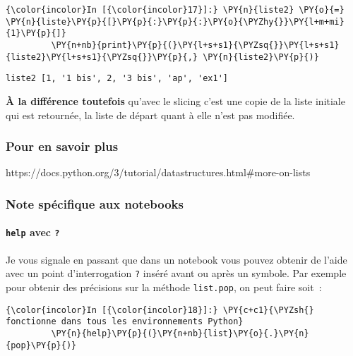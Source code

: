     \begin{Verbatim}[commandchars=\\\{\}]
{\color{incolor}In [{\color{incolor}17}]:} \PY{n}{liste2} \PY{o}{=} \PY{n}{liste}\PY{p}{[}\PY{p}{:}\PY{p}{:}\PY{o}{\PYZhy{}}\PY{l+m+mi}{1}\PY{p}{]}
         \PY{n+nb}{print}\PY{p}{(}\PY{l+s+s1}{\PYZsq{}}\PY{l+s+s1}{liste2}\PY{l+s+s1}{\PYZsq{}}\PY{p}{,} \PY{n}{liste2}\PY{p}{)}
\end{Verbatim}


    \begin{Verbatim}[commandchars=\\\{\}]
liste2 [1, '1 bis', 2, '3 bis', 'ap', 'ex1']

    \end{Verbatim}

    \textbf{À la différence toutefois} qu'avec le slicing c'est une copie de
la liste initiale qui est retournée, la liste de départ quant à elle
n'est pas modifiée.

    \hypertarget{pour-en-savoir-plus}{%
\subsubsection{Pour en savoir plus}\label{pour-en-savoir-plus}}

    https://docs.python.org/3/tutorial/datastructures.html\#more-on-lists

    \hypertarget{note-spuxe9cifique-aux-notebooks}{%
\subsubsection{Note spécifique aux
notebooks}\label{note-spuxe9cifique-aux-notebooks}}

    \hypertarget{help-avec}{%
\paragraph{\texorpdfstring{\texttt{help} avec
\texttt{?}}{help avec ?}}\label{help-avec}}

    Je vous signale en passant que dans un notebook vous pouvez obtenir de
l'aide avec un point d'interrogation \texttt{?} inséré avant ou après un
symbole. Par exemple pour obtenir des précisions sur la méthode
\texttt{list.pop}, on peut faire soit~:

    \begin{Verbatim}[commandchars=\\\{\}]
{\color{incolor}In [{\color{incolor}18}]:} \PY{c+c1}{\PYZsh{} fonctionne dans tous les environnements Python}
         \PY{n}{help}\PY{p}{(}\PY{n+nb}{list}\PY{o}{.}\PY{n}{pop}\PY{p}{)}
\end{Verbatim}


